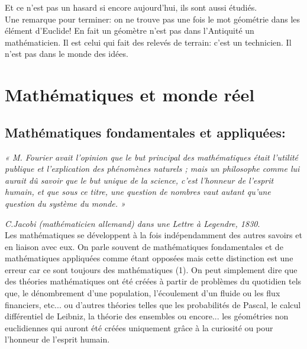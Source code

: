 \documentclass[a4paper, 12pt, twoside]{book}
\begin{document}
Et ce n'est pas un hasard si encore aujourd'hui,  ils sont aussi étudiés.\\

 
   
  
  Une remarque pour terminer: on ne trouve pas une fois le mot géométrie dans les élément d'Euclide! En fait un géomètre n'est pas dans l'Antiquité un mathématicien. Il est celui qui fait des relevés de terrain: c'est un technicien. Il n'est pas dans le monde des idées.\bigskip 
  
   

  
 

 

  
 
 
  
  
    
 
\newpage  
\chapter{Mathématiques et monde réel}

\section{Mathématiques fondamentales et appliquées:}
\textit{
« M. Fourier avait l’opinion que le but principal des mathématiques était l’utilité publique et l’explication des phénomènes naturels ; mais un philosophe comme lui aurait dû savoir que le but unique de la science, c’est l’honneur de l’esprit humain, et que sous ce titre, une question de nombres vaut autant qu’une question du système du monde. » }

\textit{C.Jacobi (mathématicien allemand) dans une Lettre à Legendre, 1830}.\\


Les mathématiques se développent à la fois indépendamment des autres savoirs et en liaison avec eux. On parle souvent de mathématiques fondamentales et de mathématiques appliquées comme étant opposées mais cette distinction est une erreur car ce sont toujours des mathématiques (1). On peut simplement dire que des théories mathématiques ont été créées à partir de problèmes du quotidien tels que, le dénombrement d'une population, l'écoulement d'un fluide ou les flux financiers, etc... ou d'autres théories telles que les  probabilités de Pascal, le calcul différentiel de Leibniz, la théorie des ensembles ou encore... les géométries non euclidiennes qui auront été créées uniquement grâce à la curiosité ou pour l'honneur de l'esprit humain. \\
\end{document}
